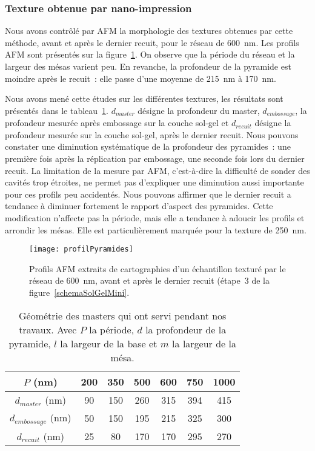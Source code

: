	\subsubsection{Texture obtenue par nano-impression}
Nous avons contrôlé par AFM la morphologie des textures obtenues par cette méthode, avant et après le dernier recuit, pour le réseau de 600~nm. Les profils AFM sont présentés sur la figure~\ref{profilPyramides}. On observe que la période du réseau et la largeur des mésas varient peu. En revanche, la profondeur de la pyramide est moindre après le recuit~: elle passe d’une moyenne de 215~nm à 170~nm.\par 
Nous avons mené cette études sur les différentes textures, les résultats sont présentés dans le tableau~\ref{tPerteRecuit}. $d_{master}$ désigne la profondeur du master, $d_{embossage}$, la profondeur mesurée après embossage sur la couche sol-gel et $d_{recuit}$ désigne la profondeur mesurée sur la couche sol-gel, après le dernier recuit. Nous pouvons constater une diminution systématique de la profondeur des pyramides~: une première fois après la réplication par embossage, une seconde fois lors du dernier recuit. La limitation de la mesure par AFM, c’est-à-dire la difficulté de sonder des cavités trop étroites, ne permet pas d’expliquer une diminution aussi importante pour ces profils peu accidentés. Nous pouvons affirmer que le dernier recuit a tendance à diminuer fortement le rapport d’aspect des pyramides. Cette modification n’affecte pas la période, mais elle a tendance à adoucir les profils et arrondir les mésas. Elle est particulièrement marquée pour la texture de 250~nm.\par 
\begin{figure}[!htb]
\centering
\texttt{[image: profilPyramides]}
\caption{Profils AFM extraits de cartographies d’un échantillon texturé par le réseau de 600~nm, avant et après le dernier recuit (étape~3 de la figure~\ref{schemaSolGelMini}.}
\label{profilPyramides}
\end{figure}
\begin{table}[!htb]
\centering
\begin{tabular}{ccccccc}
\hline
$P$ (nm) & 200 & 350 & 500 & 600 & 750 & 1000\\
\hline
$d_{master}$ (nm) & 90 & 150 & 260 & 315 & 394 & 415\\
$d_{embossage}$ (nm) & 50 & 150 & 195 & 215 & 325 & 300\\
$d_{recuit}$ (nm) & 25 & 80 & 170 & 170 & 295 & 270\\
\hline
\end{tabular}
\caption{Géométrie des masters qui ont servi pendant nos travaux. Avec $P$ la période, $d$ la profondeur de la pyramide, $l$ la largeur de la base et $m$ la largeur de la mésa.}
\label{tPerteRecuit}
\end{table}
